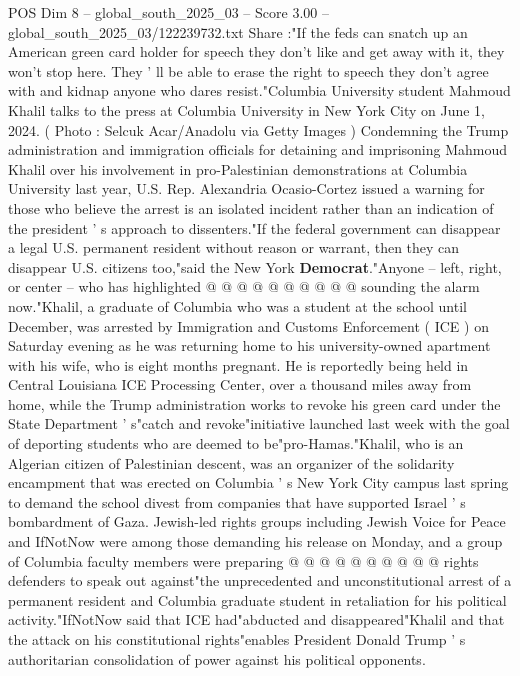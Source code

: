 \begin{textsample}{POS Dim 8 – global\_south\_2025\_03 – Score 3.00 – global\_south\_2025\_03/122239732.txt}  \label{ex:f8_pos_385}
Share :"If the feds can snatch up an American green card holder for speech they don't like and get away with it, they won't stop here.
They ' ll be able to erase the right to speech they don't agree with and kidnap anyone who dares resist."Columbia University student Mahmoud Khalil talks to the press at Columbia University in New York City on June 1, 2024. ( Photo : Selcuk Acar/Anadolu via Getty Images ) Condemning the Trump administration and immigration officials for detaining and imprisoning Mahmoud Khalil over his involvement in pro-Palestinian demonstrations at Columbia University last year, U.S.
Rep.
Alexandria Ocasio-Cortez issued a warning for those who believe the arrest is an isolated incident rather than an indication of the president ' s approach to dissenters."If the federal government can disappear a legal U.S. permanent resident without reason or warrant, then they can disappear U.S. citizens too,"said the New York \textbf{Democrat}."Anyone -- left, right, or center -- who has highlighted @ @ @ @ @ @ @ @ @ @ sounding the alarm now."Khalil, a graduate of Columbia who was a student at the school until December, was arrested by Immigration and Customs Enforcement ( ICE ) on Saturday evening as he was returning home to his university-owned apartment with his wife, who is eight months pregnant.
He is reportedly being held in Central Louisiana ICE Processing Center, over a thousand miles away from home, while the Trump administration works to revoke his green card under the State Department ' s"catch and revoke"initiative launched last week with the goal of deporting students who are deemed to be"pro-Hamas."Khalil, who is an Algerian citizen of Palestinian descent, was an organizer of the solidarity encampment that was erected on Columbia ' s New York City campus last spring to demand the school divest from companies that have supported Israel ' s bombardment of Gaza.
Jewish-led rights groups including Jewish Voice for Peace and IfNotNow were among those demanding his release on Monday, and a group of Columbia faculty members were preparing @ @ @ @ @ @ @ @ @ @ rights defenders to speak out against"the unprecedented and unconstitutional arrest of a permanent resident and Columbia graduate student in retaliation for his political activity."IfNotNow said that ICE had"abducted and disappeared"Khalil and that the attack on his constitutional rights"enables President Donald Trump ' s authoritarian consolidation of power against his political opponents.

\end{textsample}
